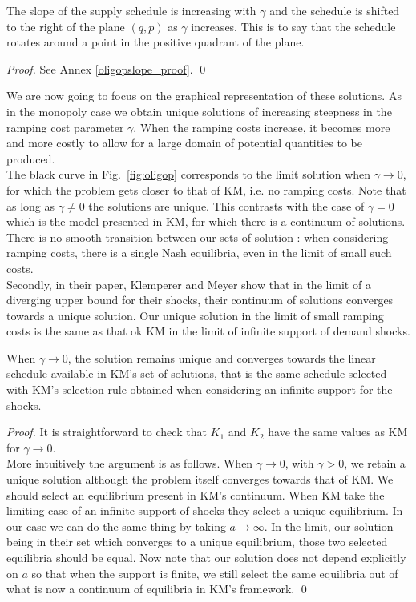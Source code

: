 \begin{proposition}\label{oligoslope_prop}
The slope of the supply schedule is increasing with $\gamma$ and the schedule is shifted to the right of the plane $(q,p)$ as $\gamma$ increases. This is to say that the schedule rotates around a point in the positive quadrant of the plane. 
\end{proposition}
\begin{proof}
See Annex \ref{oligopslope_proof}. \qed
\end{proof}

We are now going to focus on the graphical representation of these solutions. As in the monopoly case we obtain unique solutions of increasing steepness in the ramping cost parameter $\gamma$. When the ramping costs increase, it becomes more and more costly to allow for a large domain of potential quantities to be produced. \\

The black curve in Fig.~\ref{fig:oligop} corresponds to the limit solution when $\gamma\to0$, for which the problem gets closer to that of KM, i.e. no ramping costs. Note that as long as $\gamma\neq0$ the solutions are unique. This contrasts with the case of $\gamma=0$ which is the model presented in KM, for which there is a continuum of solutions. There is no smooth transition between our sets of solution : when considering ramping costs, there is a single Nash equilibria, even in the limit of small such costs.\\

Secondly, in their paper, Klemperer and Meyer show that in the limit of a diverging upper bound for their shocks, their continuum of solutions converges towards a unique solution. Our unique solution in the limit of small ramping costs is the same as that ok KM in the limit of infinite support of demand shocks.\\

\begin{proposition}
When $\gamma\to0$, the solution remains unique and converges towards the linear schedule available in KM's set of solutions, that is the same schedule selected with KM's selection rule obtained when considering an infinite support for the shocks.
\end{proposition}
\begin{proof}
It is straightforward to check that $K_1$ and $K_2$ have the same values as KM for $\gamma\to0$. \\
More intuitively the argument is as follows. When $\gamma\to 0$, with $\gamma>0$, we retain a unique solution although the problem itself converges towards that of KM. We should select an equilibrium present in KM's continuum. When KM take the limiting case of an infinite support of shocks they select a unique equilibrium. In our case we can do the same thing by taking $a\to\infty$. In the limit, our solution being in their set which converges to a unique equilibrium, those two selected equilibria should be equal. Now note that our solution does not depend explicitly on $a$ so that when the support is finite, we still select the same equilibria out of what is now a continuum of equilibria in KM's framework.             \qed
\end{proof}


